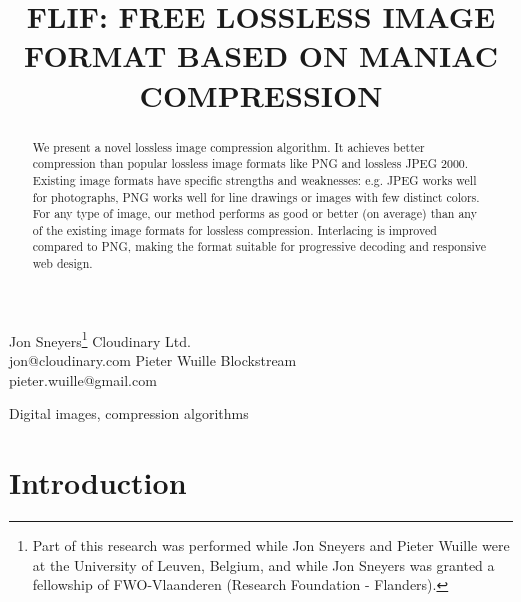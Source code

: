 \documentclass{article}
\begin{document}
\renewcommand{\paragraph}[1]{{\bf #1}}
\newcommand{\comment}[1]{}

\title{FLIF: FREE LOSSLESS IMAGE FORMAT BASED ON MANIAC COMPRESSION}
\twoauthors
  {Jon Sneyers\thanks{Part of this research was performed while Jon Sneyers and Pieter Wuille were at
                      the University of Leuven, Belgium,
                      and while Jon Sneyers was granted a fellowship of FWO-Vlaanderen (Research Foundation - Flanders).}}
	{Cloudinary Ltd.\\
	jon@cloudinary.com}
  {Pieter Wuille}
	{Blockstream\\
	pieter.wuille@gmail.com}


\maketitle

\begin{abstract}
We present a novel lossless image compression algorithm.
It achieves better compression than popular lossless image formats like PNG and lossless JPEG 2000.
Existing image formats have specific strengths and weaknesses: e.g. JPEG works well for photographs,
PNG works well for line drawings or images with few distinct colors.
For any type of image,
our method performs as good or better (on average) than any of the existing image formats for lossless compression.
Interlacing is improved compared to PNG, making the format suitable for progressive decoding and responsive web design.
\end{abstract}
\begin{keywords}
Digital images, compression algorithms
\end{keywords}

\section{Introduction}
\end{document}
